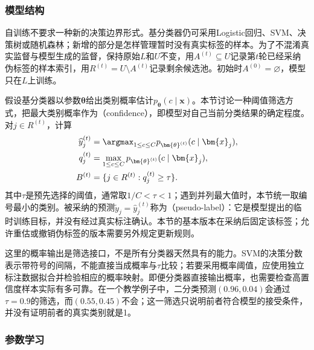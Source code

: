 \subsubsection{模型结构}
\label{sec:classification-self-training-structure}

自训练不要求一种新的决策边界形式。基分类器仍可采用Logistic回归、SVM、决策树或随机森林；新增的部分是怎样管理暂时没有真实标签的样本。为了不混淆真实监督与模型生成的监督，保持原始$L$和$U$不变，用$A^{(t)}\subseteq U$记录第$t$轮已经采纳伪标签的样本索引，用$R^{(t)}=U\setminus A^{(t)}$记录剩余候选池。初始时$A^{(0)}=\varnothing$，模型只在$L$上训练。

假设基分类器以参数$\bm{\theta}$给出类别概率估计$p_{\bm{\theta}}(c\mid\bm{x})$。本节讨论一种阈值筛选方式，把最大类别概率作为（confidence），即模型对自己当前分类结果的确定程度。对$j\in R^{(t)}$，计算
\begin{equation}
  \label{eq:classification-self-training-selection}
  \begin{aligned}
    \widehat y_j^{(t)}
      &=\argmax_{1\leq c\leq C}
        p_{\bm{\theta}^{(t)}}(c\mid\bm{x}_j),\\
    q_j^{(t)}
      &=\max_{1\leq c\leq C}
        p_{\bm{\theta}^{(t)}}(c\mid\bm{x}_j),\\
    B^{(t)}
      &=\{j\in R^{(t)}:q_j^{(t)}\geq\tau\}.
  \end{aligned}
\end{equation}
其中$\tau$是预先选择的阈值，通常取$1/C<\tau<1$；遇到并列最大值时，本节统一取编号最小的类别。被采纳的预测$\widetilde y_j=\widehat y_j^{(t)}$称为（pseudo-label）：它是模型提出的临时训练目标，并没有经过真实标注确认。本节的基本版本在采纳后固定该标签；允许重估或撤销伪标签的版本需要另外规定更新规则。

这里的概率输出是筛选接口，不是所有分类器天然具有的能力。SVM的决策分数表示带符号的间隔，不能直接当成概率与$\tau$比较；若要采用概率阈值，应使用独立标注数据拟合并检验相应的概率映射。即便分类器直接输出概率，也需要检查高置信度样本实际有多可靠。在一个教学例子中，二分类预测$(0.96,0.04)$会通过$\tau=0.9$的筛选，而$(0.55,0.45)$不会；这一筛选只说明前者符合模型的接受条件，并没有证明前者的真实类别就是1。

\subsubsection{参数学习}
\label{sec:classification-self-training-learning}

